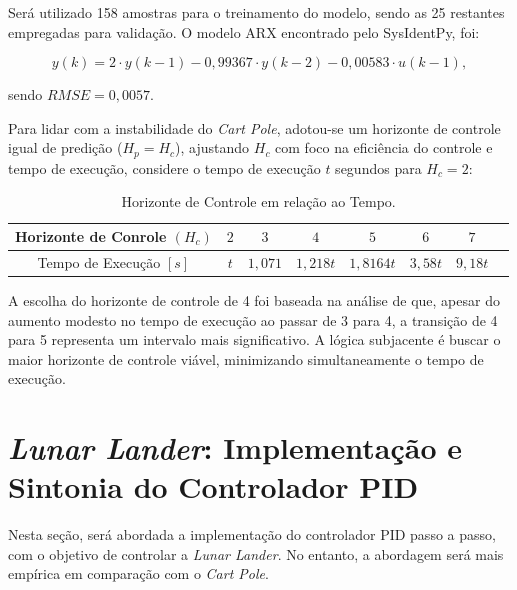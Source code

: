 \documentclass[12pt,           %
a4paper,                       %
openany,                       %
oneside,                       %
chapter=TITLE,                 %
english,                       %
spanish,                       %
brazil,                        %
sumario=tradicional]{abntex2}  %
\begin{document}
\begin{OnehalfSpace}
Será utilizado 158 amostras para o treinamento do modelo, sendo as 25 restantes empregadas para validação. O modelo ARX encontrado pelo SysIdentPy, foi:

\begin{equation}
    y(k) = 2\cdot y(k-1)- 0,99367\cdot y(k-2)  - 0,00583\cdot u(k-1),
    \label{eq:28}
\end{equation}

\noindent sendo $RMSE = 0,0057$.

Para lidar com a instabilidade do \textit{Cart Pole}, adotou-se um horizonte de controle igual de predição ($H_p=H_c$), ajustando $H_c$ com foco na eficiência do controle e tempo de execução, considere o tempo de execução $t$ segundos para $H_c=2$:
 
\begin{table}[H]
	\centering
	\vspace*{-.2cm}
	\caption{Horizonte de Controle em relação ao Tempo.}
	\begin{tabular}{|c|c|c|c|c|c|c|c|}
            \hline
            Horizonte de Conrole $(H_c)$ & $2$ & $3$ & $4$ & $5$ & $6$ & $7$ \\
            \hline
            Tempo de Execução $[s]$ & $t$ & $1,071$ & $1,218t$ & $1,8164t$ & $3,58t$ & $9,18t$\\ 
            \hline
	\end{tabular}  
    \label{tab:HCcartpole}                 %
\end{table}
\vspace*{-0.7cm}
{\raggedright {}}

A escolha do horizonte de controle de 4 foi baseada na análise de que, apesar do aumento modesto no tempo de execução ao passar de 3 para 4, a transição de 4 para 5 representa um intervalo mais significativo. A lógica subjacente é buscar o maior horizonte de controle viável, minimizando simultaneamente o tempo de execução.

\section{\textit{Lunar Lander}: Implementação e Sintonia do Controlador PID}
\label{sec:pidLunarLander} 

Nesta seção, será abordada a implementação do controlador PID passo a passo, com o objetivo de controlar a \textit{Lunar Lander}. No entanto, a abordagem será mais empírica em comparação com o \textit{Cart Pole}.


\end{OnehalfSpace}
\end{document}
